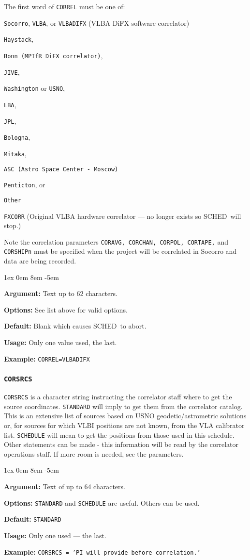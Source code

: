 \documentclass{report}
\newcommand{\schedb}{{\sc SCHED~}}
\newcommand{\rcwbox}[5]{
  \begin{list}{}{\parsep 1ex  \itemsep 0em
                 \leftmargin 8em  \itemindent -5em }
    \item {\bf Argument:} #1
    \item {\bf Options:}  #2
    \item {\bf Default:}  #3
    \item {\bf Usage:}    #4
    \item {\bf Example:}  #5
  \end{list}
}
\begin{document}
The first word of {\tt CORREL} must be one of:
\begin{list}{}{\parsep 0em  \itemsep 0em }
\item {\tt Socorro}, {\tt VLBA}, or {\tt VLBADIFX}
(VLBA DiFX software correlator)
\item {\tt Haystack},
\item {\tt Bonn (MPIfR DiFX correlator)},
\item {\tt JIVE},
\item {\tt Washington} or {\tt USNO},
\item {\tt LBA},
\item {\tt JPL},
\item {\tt Bologna},
\item {\tt Mitaka},
\item {\tt ASC (Astro Space Center - Moscow)}
\item {\tt Penticton}, or
\item {\tt Other}
\item {\tt FXCORR} (Original VLBA hardware correlator --- no longer 
exists so \schedb will stop.)
\end{list}

Note the correlation parameters {\tt CORAVG, CORCHAN,
CORPOL, CORTAPE,} and {\tt CORSHIPn} must be specified when
the project will be correlated in Socorro and data
are being recorded.

\rcwbox
{Text up to 62 characters.}
{See list above for valid options.}
{Blank which causes \schedb to abort.}
{Only one value used, the last.}
{{\tt CORREL=VLBADIFX}}


\subsubsection{\label{MP:CORSRCS}{\tt CORSRCS}}

{\tt CORSRCS} is a character string instructing the correlator
staff where to get the source coordinates.  {\tt STANDARD}
will imply to get them from the correlator catalog.  This is
an extensive list of sources based on USNO geodetic/astrometric
solutions or, for sources for which VLBI positions are not
known, from the VLA calibrator list.  {\tt SCHEDULE} will
mean to get the positions from those used in this schedule.
Other statements can be made - this information will be
read by the correlator operations staff.  If more room is
needed, see the  parameters.

\rcwbox
{Text of up to 64 characters.}
{{\tt STANDARD} and {\tt SCHEDULE} are useful.  Others can be
used.}
{{\tt STANDARD}}
{Only one used --- the last.}
{{\tt CORSRCS = 'PI will provide before correlation.'}}
\end{document}
